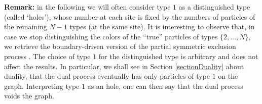 \documentclass[10pt]{article}
\numberwithin{equation}{section}
\numberwithin{equation}{subsection}
\begin{document}
\vspace{.5cm}
\noindent
{\bf Remark:} in the following we will often consider type $1$ as a distinguished type
(called `holes'), whose number at each site is fixed by the numbers of particles 
of the remaining $N-1$ types (at the same site). It is interesting to observe that, in case we stop distinguishing the colors of the ``true'' particles of types $\{2,\ldots,N\}$, we retrieve the 
boundary-driven version of the partial symmetric exclusion process \cite{schutzSandow,carinci2013duality}.
The choice of type $1$ for the distinguished type is arbitrary and does not affect
the results. In particular, we shall see in Section \ref{sectionDuality} about duality, that
the dual process eventually has only particles of type $1$ on the graph.
Interpreting type $1$ as an hole, one can then say that the dual process voids the graph.  
\end{document}
